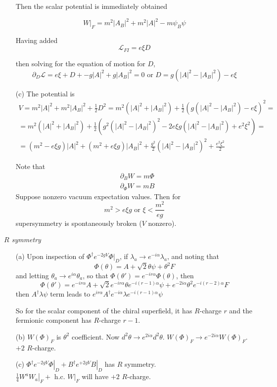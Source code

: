 \documentclass[twoside]{amsart}
\newcommand{\problemhead}[1]
  {\smallskip
   \noindent{\large\bf Problem #1.}
   }
\begin{document}
\begin{enumerate}
Then the scalar potential is immediately obtained

\[
\left. W \right|_F = m^2 |A_B|^2 + m^2 |A|^2 - m \psi_B \psi
\]


Having added 
\[
\mathcal{L}_{FI} = e\xi D
\]

then solving for the equation of motion for $D$,
\[
\partial_D \mathcal{L} = e\xi + D + - g|A|^2 + g |A_B|^2 = 0 \text{ or } D = g(|A|^2 - |A_B|^2) - e\xi
\]
\item[(c)] The potential is 
\[
\begin{gathered}
  V = m^2 | A|^2 + m^2 |A_B|^2 + \frac{1}{2} D^2 = m^2 (|A|^2 + |A_B|^2) + \frac{1}{2} ( g(|A|^2  - |A_B|^2) - e\xi )^2 = \\
   = m^2 ( |A|^2 + |A_B|^2) + \frac{1}{2} (g^2 ( |A|^2 - |A_B|^2 )^2  - 2 e \xi g(|A|^2 - |A_B|^2 ) + e^2 \xi^2 ) = \\
   = (m^2 - e \xi g) |A|^2 + (m^2 + e\xi g) |A_B|^2 + \frac{g^2}{2} ( |A|^2 - |A_B|^2 )^2 + \frac{ e^2 \xi^2 }{2} 
\end{gathered}
\]

Note that 
\[
\begin{aligned}
  & \partial_B W = m \Phi \\ 
  &  \partial_{\Phi}W = mB
\end{aligned}
\]
Suppose nonzero vacuum expectation values.  Then for 
\[
m^2 > e \xi g \text{ or } \xi < \frac{m^2}{eg}
\]
supersymmetry is spontaneously broken ($V$ nonzero).  
\end{enumerate}

\problemhead{95.6} \emph{$R$ symmetry}
\begin{enumerate}
\item[(a)] Upon inspection of $\Phi^{\dag} e^{-2gV } \left. \Phi \right|_D$, if $\lambda_a \to e^{ - i \alpha} \lambda_a$, and noting that 
\[
\Phi(\theta) = A + \sqrt{2} \theta \psi + \theta^2 F
\]
and letting $\theta_a \to e^{i \alpha} \theta_a$, 
so that $\Phi(\theta') = e^{-ir \alpha} \Phi(\theta)$, then
\[
\Phi(\theta') = e^{-ir\alpha} A + \sqrt{2} e^{-ir \alpha} \theta e^{-i (r-1) \alpha} \psi + e^{-2i\alpha} \theta^2 e^{-i (r-2) \alpha} F
\]
then $A^{\dag} \lambda \psi$ term leads to $e^{ir\alpha} A^{\dag} e^{-i\alpha} \lambda e^{-i(r-1)\alpha} \psi$

So for the scalar component of the chiral superfield, it has $R$-charge $r$ and the fermionic component has $R$-charge $r-1$.  
\item[(b)] $W(\Phi)_F$ is $\theta^2$ coefficient.  Now $d^2\theta \to e^{2i\alpha} d^2\theta$.  $W(\Phi)_F \to e^{-2i\alpha} W(\Phi)_F$.  $+2$ $R$-charge.  
\item[(c)] $\left. \Phi^{\dag}e^{-2gV} \Phi\right|_D + \left. B^{\dag} e^{+2gV} B \right|_D$ has $R$ symmetry.  \\
$\frac{1}{4} \left. W^a W_a\right|_F + \text{ h.c. } \left. W\right|_F$ will have $+2$ $R$-charge.
\end{enumerate}
\end{document}
